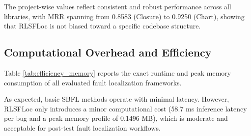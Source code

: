 \documentclass[article,article,submit,pdftex,moreauthors]{Definitions/mdpi}
\begin{document}
The project-wise values reflect consistent and robust performance across all libraries, with MRR spanning from 0.8583 (Closure) to 0.9250 (Chart), showing that RLSFLoc is not biased toward a specific codebase structure.

\subsection{Computational Overhead and Efficiency}

Table \ref{tab:efficiency_memory} reports the exact runtime and peak memory consumption of all evaluated fault localization frameworks.

\begin{table}[H]
\caption{Runtime and Memory Overhead Comparison}
\label{tab:efficiency_memory}
\centering
\renewcommand{\arraystretch}{1.15}
\end{table}

As expected, basic SBFL methods operate with minimal latency. However, RLSFLoc only introduces a minor computational cost (58.7 ms inference latency per bug and a peak memory profile of 0.1496 MB), which is moderate and acceptable for post-test fault localization workflows.
\end{document}
